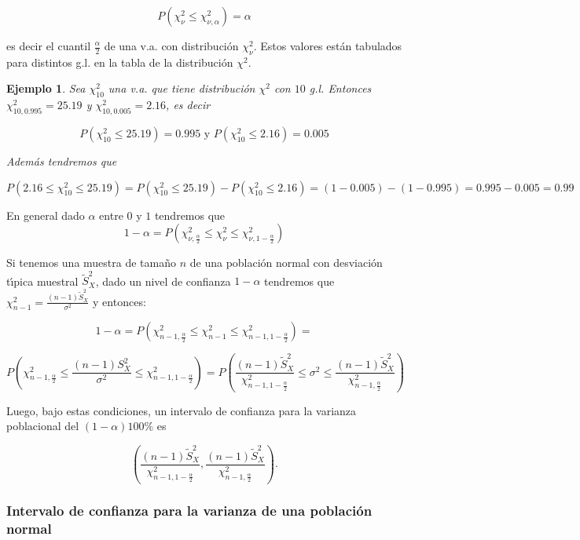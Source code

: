 \documentclass[12pt]{report}
\newtheorem{example}[definition]{Ejemplo}
\begin{document}
         $$P(\chi_{\nu}^2\leq \chi_{\nu,\alpha}^2)=\alpha$$

         es decir el cuantil $\frac{\alpha}{2}$ de una v.a. con distribuci\'on
         $\chi_{\nu}^2.$
                  Estos valores est\'an tabulados para distintos g.l. en la tabla de la
         distribuci\'on $\chi^2$.

         \begin{example}
         Sea $\chi_{10}^2$ una v.a. que tiene distribuci\'on $\chi^2$ con
         $10$ g.l.
                Entonces $\chi_{10,0.995}^2=25.19$ y
                $\chi_{10,0.005}^2=2.16$, es decir

                 $$P(\chi_{10}^2\leq 25.19)=0.995\mbox{ y } P(\chi_{10}^2\leq 2.16)=0.005$$

                 Adem\'as tendremos que

                $$P(2.16\leq \chi_{10}^2\leq 25.19)=P(\chi_{10}^2\leq
                 25.19)-P(\chi_{10}^2\leq
                 2.16)=(1-0.005)-(1-0.995)=0.995-0.005=0.99$$
         \end{example}



    En general dado $\alpha$ entre $0$ y $1$
    tendremos que
    $$1-\alpha=P(\chi_{\nu,\frac{\alpha}{2}}^2\leq \chi_{\nu}^2\leq
    \chi_{\nu,1-\frac{\alpha}{2}}^2)$$

    Si tenemos una muestra de tama\~{n}o $n$ de una poblaci\'on
    normal con desviaci\'on t\'{\i}pica muestral $\tilde{S}_{X}^2$, dado un nivel de
    confianza $1-\alpha$ tendremos que $\chi_{n-1}^2=\frac{(n-1)
    \tilde{S}_{X}^2}{\sigma^2}$ y entonces:

    $$1-\alpha=P(\chi_{n-1,\frac{\alpha}{2}}^2\leq \chi_{n-1}^2\leq
    \chi_{n-1,1-\frac{\alpha}{2}}^2)=$$

    $$P(\chi_{n-1,\frac{\alpha}{2}}^2\leq \frac{(n-1)
    S_{X}^2}{\sigma^2}\leq
    \chi_{n-1,1-\frac{\alpha}{2}}^2)=
    P(\frac{(n-1)
    \tilde{S}_{X}^2}{\chi_{n-1,1-\frac{\alpha}{2}}^2}\leq\sigma^2\leq
    \frac{(n-1)
    \tilde{S}_{X}^2}{\chi_{n-1,\frac{\alpha}{2}}^2})$$



    Luego, bajo estas condiciones, un intervalo de confianza para la
    varianza poblacional del $(1-\alpha) 100\%$ es


    $$\left(  \frac{(n-1)
    \tilde{S}_{X}^2}{\chi_{n-1,1-\frac{\alpha}{2}}^2},
    \frac{(n-1)
    \tilde{S}_{X}^2}{\chi_{n-1,\frac{\alpha}{2}}^2}\right).$$

    \subsubsection{Intervalo de confianza para la varianza de una poblaci\'on
    normal}
\end{document}

